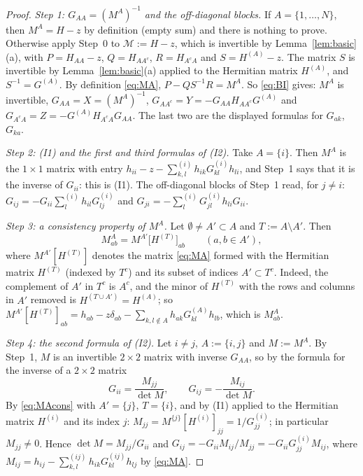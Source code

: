 \begin{proof}
\emph{Step 1: $G_{AA}=(M^A)^{-1}$ and the off-diagonal blocks.} If $A=\{1,\dots,N\}$, then $M^A=H-z$ by definition (empty sum) and there is nothing to prove.
Otherwise apply Step~0 to $\mathcal M:=H-z$, which is invertible by Lemma~\ref{lem:basic}(a), with
$P=H_{AA}-z$, $Q=H_{AA^c}$, $R=H_{A^cA}$ and $S=H^{(A)}-z$. The matrix $S$ is invertible by Lemma~\ref{lem:basic}(a) applied to the Hermitian matrix $H^{(A)}$, and $S^{-1}=G^{(A)}$.
By definition \eqref{eq:MA}, $P-QS^{-1}R=M^A$. So \eqref{eq:BI} gives: $M^A$ is invertible, $G_{AA}=X=(M^A)^{-1}$, $G_{AA^c}=Y=-G_{AA}H_{AA^c}G^{(A)}$ and $G_{A^cA}=Z=-G^{(A)}H_{A^cA}G_{AA}$.
The last two are the displayed formulas for $G_{ak}$, $G_{ka}$.

\emph{Step 2: \textup{(I1)} and the first and third formulas of \textup{(I2)}.} Take $A=\{i\}$. Then $M^A$ is the $1\times1$ matrix with entry $h_{ii}-z-\sum^{(i)}_{k,l}h_{ik}G^{(i)}_{kl}h_{li}$, and Step~1 says that it is the inverse of $G_{ii}$: this is (I1).
The off-diagonal blocks of Step~1 read, for $j\ne i$: $G_{ij}=-G_{ii}\sum^{(i)}_lh_{il}G^{(i)}_{lj}$ and $G_{ji}=-\sum^{(i)}_lG^{(i)}_{jl}h_{li}G_{ii}$.

\emph{Step 3: a consistency property of $M^A$.} Let $\emptyset\ne A'\subset A$ and $T:=A\setminus A'$. Then
\begin{equation}\tag{$\ast$}\label{eq:MAcons}
 M^A_{ab}=M^{A'}\big[H^{(T)}\big]_{ab}\qquad(a,b\in A'),
\end{equation}
where $M^{A'}[H^{(T)}]$ denotes the matrix \eqref{eq:MA} formed with the Hermitian matrix $H^{(T)}$ (indexed by $T^c$) and its subset of indices $A'\subset T^c$.
Indeed, the complement of $A'$ in $T^c$ is $A^c$, and the minor of $H^{(T)}$ with the rows and columns in $A'$ removed is $H^{(T\cup A')}=H^{(A)}$; so
$M^{A'}[H^{(T)}]_{ab}=h_{ab}-z\delta_{ab}-\sum_{k,l\notin A}h_{ak}G^{(A)}_{kl}h_{lb}$, which is $M^A_{ab}$.

\emph{Step 4: the second formula of \textup{(I2)}.} Let $i\ne j$, $A:=\{i,j\}$ and $M:=M^A$. By Step~1, $M$ is an invertible $2\times2$ matrix with inverse $G_{AA}$, so by the formula for the inverse of a $2\times2$ matrix
\[
 G_{ii}=\frac{M_{jj}}{\det M},\qquad G_{ij}=-\frac{M_{ij}}{\det M}.
\]
By \eqref{eq:MAcons} with $A'=\{j\}$, $T=\{i\}$, and by (I1) applied to the Hermitian matrix $H^{(i)}$ and its index $j$: $M_{jj}=M^{\{j\}}[H^{(i)}]_{jj}=1/G^{(i)}_{jj}$; in particular $M_{jj}\ne0$.
Hence $\det M=M_{jj}/G_{ii}$ and $G_{ij}=-G_{ii}M_{ij}/M_{jj}=-G_{ii}G^{(i)}_{jj}M_{ij}$, where $M_{ij}=h_{ij}-\sum^{(ij)}_{k,l}h_{ik}G^{(ij)}_{kl}h_{lj}$ by \eqref{eq:MA}.


\end{proof}
